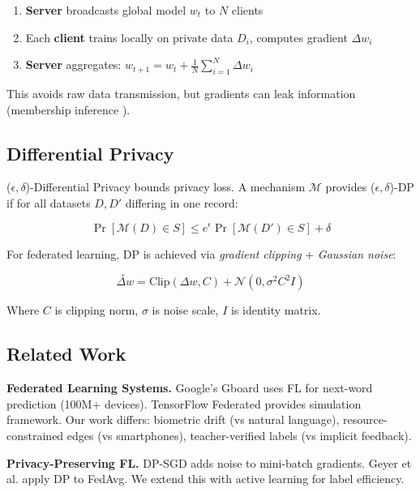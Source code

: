 \documentclass[conference]{IEEEtran}
\begin{document}
\begin{enumerate}
    \item \textbf{Server} broadcasts global model $w_t$ to $N$ clients
    \item Each \textbf{client} trains locally on private data $D_i$, computes gradient $\Delta w_i$
    \item \textbf{Server} aggregates: $w_{t+1} = w_t + \frac{1}{N}\sum_{i=1}^{N} \Delta w_i$
\end{enumerate}

This avoids raw data transmission, but gradients can leak information (membership inference \cite{nasr2019}).

\subsection{Differential Privacy}

($\epsilon, \delta$)-Differential Privacy \cite{dwork2014} bounds privacy loss. A mechanism $\mathcal{M}$ provides ($\epsilon, \delta$)-DP if for all datasets $D, D'$ differing in one record:

\begin{equation}
\Pr[\mathcal{M}(D) \in S] \leq e^{\epsilon} \Pr[\mathcal{M}(D') \in S] + \delta
\end{equation}

For federated learning, DP is achieved via \textit{gradient clipping} + \textit{Gaussian noise}:

\begin{equation}
\tilde{\Delta w} = \text{Clip}(\Delta w, C) + \mathcal{N}(0, \sigma^2 C^2 I)
\label{eq:dp}
\end{equation}

Where $C$ is clipping norm, $\sigma$ is noise scale, $I$ is identity matrix.

\subsection{Related Work}

\textbf{Federated Learning Systems.} Google's Gboard \cite{hard2018} uses FL for next-word prediction (100M+ devices). TensorFlow Federated \cite{tff2019} provides simulation framework. Our work differs: biometric drift (vs natural language), resource-constrained edges (vs smartphones), teacher-verified labels (vs implicit feedback).

\textbf{Privacy-Preserving FL.} DP-SGD \cite{abadi2016} adds noise to mini-batch gradients. Geyer et al. \cite{geyer2017} apply DP to FedAvg. We extend this with active learning for label efficiency.
\end{document}
